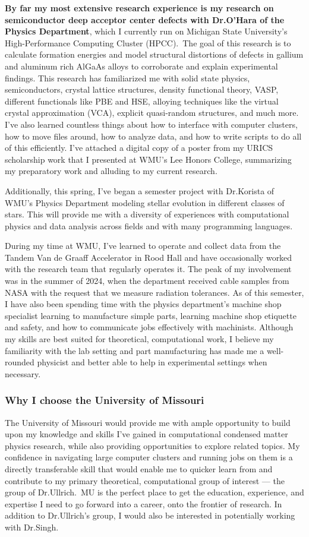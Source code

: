 \documentclass[11pt]{article}
\newcommand{\school}{University of Missouri}
\newcommand{\schoolabbr}{MU}
\begin{document}
\textbf{By far my most extensive research experience is my research on semiconductor deep acceptor center defects with Dr.\@ O'Hara of the Physics Department}, which I currently run on Michigan State University's High-Performance Computing Cluster (HPCC).\ The goal of this research is to calculate formation energies and model structural distortions of defects in gallium and aluminum rich AlGaAs alloys to corroborate and explain experimental findings. This research has familiarized me with solid state physics, semiconductors, crystal lattice structures, density functional theory, VASP, different functionals like PBE and HSE, alloying techniques like the virtual crystal approximation (VCA), explicit quasi-random structures, and much more. I've also learned countless things about how to interface with computer clusters, how to move files around, how to analyze data, and how to write scripts to do all of this efficiently. I've attached a digital copy of a poster from my URICS scholarship work that I presented at WMU's Lee Honors College, summarizing my preparatory work and alluding to my current research.
\pagebreak

Additionally, this spring, I've began a semester project with Dr.\@ Korista of WMU's Physics Department modeling stellar evolution in different classes of stars. This will provide me with a diversity of experiences with computational physics and data analysis across fields and with many programming languages.

During my time at WMU, I've learned to operate and collect data from the Tandem Van de Graaff Accelerator in Rood Hall and have occasionally worked with the research team that regularly operates it. The peak of my involvement was in the summer of 2024, when the department received cable samples from NASA with the request that we measure radiation tolerances. As of this semester, I have also been spending time with the physics department's machine shop specialist learning to manufacture simple parts, learning machine shop etiquette and safety, and how to communicate jobs effectively with machinists. Although my skills are best suited for theoretical, computational work, I believe my familiarity with the lab setting and part manufacturing has made me a well-rounded physicist and better able to help in experimental settings when necessary.

\subsubsection*{Why I choose the \school{}}
The \school{} would provide me with ample opportunity to build upon my knowledge and skills I've gained in computational condensed matter physics research, while also providing opportunities to explore related topics. My confidence in navigating large computer clusters and running jobs on them is a directly transferable skill that would enable me to quicker learn from and contribute to my primary theoretical, computational group of interest --- the group of Dr.\@ Ullrich.\ \schoolabbr{} is the perfect place to get the education, experience, and expertise I need to go forward into a career, onto the frontier of research. In addition to Dr.\@ Ullrich's group, I would also be interested in potentially working with Dr.\@ Singh.
\end{document}
